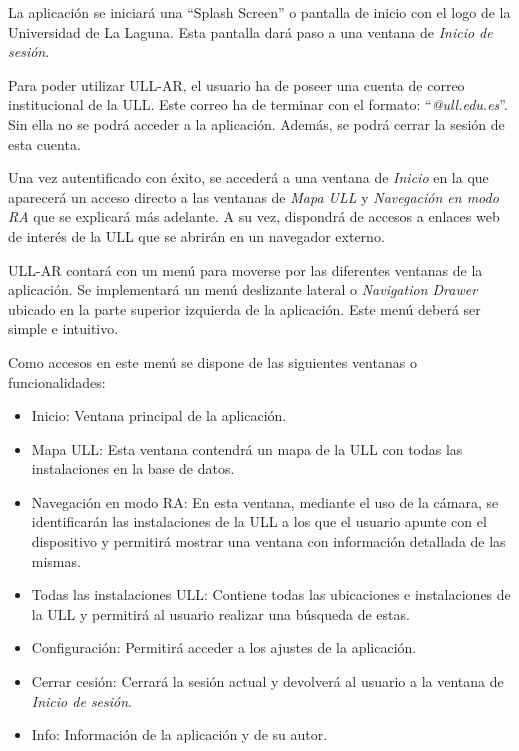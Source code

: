 La aplicación se iniciará una ``Splash Screen'' \cite{URL::SplashScreen} o pantalla de inicio con el logo de la Universidad de La Laguna. Esta pantalla dará paso a una ventana de \textit{Inicio de sesión}.

Para poder utilizar ULL-AR, el usuario ha de poseer una cuenta de correo institucional de la ULL. Este correo ha de terminar con el formato: ``\textit{@ull.edu.es}''. Sin ella no se podrá acceder a la aplicación. Además, se podrá cerrar la sesión de esta cuenta.

Una vez autentificado con éxito, se accederá a una ventana de \textit{Inicio} en la que aparecerá un acceso directo a las ventanas de \textit{Mapa ULL} y \textit{Navegación en modo RA} que se  explicará más adelante. A su vez, dispondrá de accesos a enlaces web de interés de la ULL que se abrirán en un navegador externo. 

ULL-AR contará con un menú para moverse por las diferentes ventanas de la aplicación. Se implementará un menú deslizante lateral o \textit{Navigation Drawer} \cite{URL::NavigationDraw} ubicado en la parte superior izquierda de la aplicación. Este menú deberá ser simple e intuitivo.

Como accesos en este menú se dispone de las siguientes ventanas o funcionalidades:

\begin{itemize}
    \item Inicio: Ventana principal de la aplicación.
    \item Mapa ULL: Esta ventana contendrá un mapa de la ULL con todas las instalaciones en la base de datos.
    \item Navegación en modo RA: En esta ventana, mediante el uso de la cámara, se identificarán las instalaciones de la ULL a los que el usuario apunte con el dispositivo y permitirá mostrar una ventana con información detallada de las mismas.
    \item Todas las instalaciones ULL: Contiene todas las ubicaciones e instalaciones de la ULL y permitirá al usuario realizar una búsqueda de estas. 
    \item Configuración: Permitirá acceder a los ajustes de la aplicación.
    \item Cerrar cesión: Cerrará la sesión actual y devolverá al usuario a la ventana de \textit{Inicio de sesión}.
    \item Info: Información de la aplicación y de su autor.
\end{itemize}

